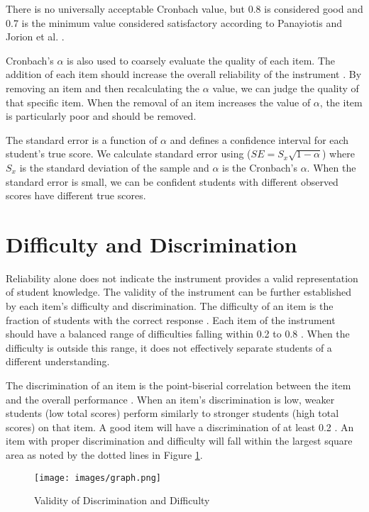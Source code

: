 There is no universally acceptable Cronbach value, but 0.8 is considered good and 0.7 is the minimum value considered satisfactory according to Panayiotis \cite{panayiotis} and Jorion et al. \cite{jorian}.     
     
Cronbach's $\alpha$ is also used to coarsely evaluate the quality of each item. The addition of each item should increase the overall reliability of the instrument \cite{dlci}. By removing an item and then recalculating the $\alpha$ value, we can judge the quality of that specific item. When the removal of an item increases the value of $\alpha$, the item is particularly poor and should be removed.     
     
The standard error is a function of $\alpha$ and defines a confidence interval for each student's true score. We calculate standard error using ($SE = S_x \sqrt{1-\alpha}$) where $S_x$ is the standard deviation of the sample and $\alpha$ is the Cronbach's $\alpha$. When the standard error is small, we can be confident students with different observed scores have different true scores.   


\section{Difficulty and Discrimination}

Reliability alone does not indicate the instrument provides a valid representation of student knowledge. The validity of the instrument can be further established by each item's difficulty and discrimination. The difficulty of an item is the fraction of students with the correct response \cite{og_ctt}.  Each item of the instrument should have a balanced range of difficulties falling within 0.2 to 0.8 \cite{dlci, jorian}. When the difficulty is outside this range, it does not effectively separate students of a different understanding.     
     
The discrimination of an item is the point-biserial correlation between the item and the overall performance \cite{jorian}. When an item's discrimination is low, weaker students (low total scores) perform similarly to stronger students (high total scores) on that item. A good item will have a discrimination of at least 0.2 \cite{dlci}. \iflong An item with proper discrimination and difficulty will fall within the largest square area as noted by the dotted lines in Figure \ref{fig:ideal}.\fi      
     
\iflong     
\begin{figure}[ht]     
    \begin{center}     
    \advance\leftskip-3cm     
    \advance\rightskip-3cm     
    \texttt{[image: images/graph.png]}     
    \caption{Validity of Discrimination and Difficulty}     
    \label{fig:ideal}     
\end{center}     
\end{figure}     
\fi     


